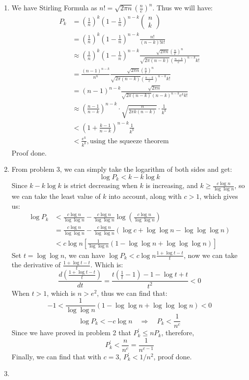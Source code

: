 \documentclass[12pt, a4paper]{article}
\begin{document}
\begin{enumerate}
    \item We have Stirling Formula as $n! = \sqrt{2\pi n}(\frac{n}{e})^n$. Thus we will have: 
          \begin{align*}
              P_k &= (\frac{1}{n})^k (1 - \frac{1}{n})^{n - k} \begin{pmatrix} n\\ k \end{pmatrix}\\
                  &= (\frac{1}{n})^k (1 - \frac{1}{n})^{n - k} \frac{n!}{(n-k)!k!}\\
                  &\approx (\frac{1}{n})^k (1 - \frac{1}{n})^{n - k} \frac{\sqrt{2\pi n}(\frac{n}{e})^n}{\sqrt{2\pi (n-k)}(\frac{n-k}{e})^{n-k} k!}\\
                  &= \frac{(n-1)^{n-k}}{n^n} \frac{\sqrt{2\pi n}(\frac{n}{e})^n}{\sqrt{2\pi (n-k)}(\frac{n-k}{e})^{n-k} k!}\\
                  &= (n-1)^{n-k} \frac{\sqrt{2\pi n}}{\sqrt{2\pi (n-k)} (n-k)^{n-k} e^k k!}\\
                  &\approx (\frac{n-1}{n-k})^{n-k}\cdot \sqrt{\frac{n}{2\pi k(n-k)}}\cdot \frac{1}{k^k}\\
                  &< (1 + \frac{k-1}{n-k})^{n-k} \frac{1}{k^k}\\
                  &< \frac{e^k}{k^k}, \text{using the squeeze theorem}
          \end{align*}
          Proof done.
    
    \item From problem 3, we can simply take the logarithm of both sides and get:
          $$\log P_k < k - k\log k$$
          Since $k - k\log k$ is strict decreasing when $k$ is increasing, and $k \geq \frac{c\log n}{\log \log n}$, 
          so we can take the least value of $k$ into account, along with $c > 1$, which gives us: 
          \begin{align*}
              \log P_k &< \frac{c\log n}{\log \log n} - \frac{c\log n}{\log \log n} \log (\frac{c\log n}{\log \log n})\\
                       &= \frac{c\log n}{\log \log n} - \frac{c\log n}{\log \log n}(\log c + \log \log n - \log \log \log n)\\
                       &< c\log n[\frac{1}{\log \log n} (1 - \log \log n + \log \log \log n) ]
          \end{align*}
          Set $t = \log \log n$, we can have $\log P_k < c \log n \frac{1 + \log t - t}{t}$, 
          now we can take the derivative of $\frac{1 + \log t - t}{t}$. Which is: 
          $$\frac{d(\frac{1 + \log t - t}{t})}{dt} = \frac{t(\frac{1}{t} - 1) - 1 - \log t + t}{t^2} < 0$$
          When $t > 1$, which is $n > e^2$, thus we can find that: 
          $$-1 < \frac{1}{\log \log n} (1 - \log \log n + \log \log \log n) < 0$$
          $$\log P_k < -c\log n \quad \Rightarrow \quad P_k < \frac{1}{n^c}$$
          Since we have proved in problem 2 that $P_k^\prime \leq nP_k$, therefore, 
          $$P_k^\prime < \frac{n}{n^c} = \frac{1}{n^{c-1}}$$
          Finally, we can find that with $c = 3$, $P_k^\prime < 1/n^2$, proof done.

    \item 

\end{enumerate}
\end{document}
